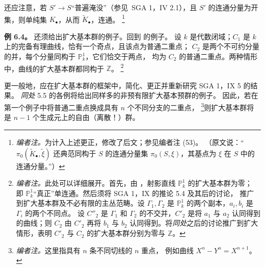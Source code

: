 还应注意，若 \(S'\to S\)“普遍淹没”（参见\ SGA 1，IV 2.1），且 \(S'\)
的连通分量为开集，则单纯集 \(K_\bullet\)，从而 \(\widetilde K_\bullet\)，连通。
\footnote{\textit{编者注。}为计入上述更正，修改了后文；参见编者注 (53)。
（原文说：“\(\pi_0(\widetilde K_\bullet,\widetilde\xi)\) 还典范同构于
\(S\) 的连通分量集 \(\pi_0(S,\xi)\)，其基点为 \(\xi\) 在 \(S\) 中的连通分量。”）}

\par\medskip\noindent
\textbf{例 6.4。}\enspace
还须给出扩大基本群的例子。回到  的例子。
设 \(k\) 是代数闭域；\(C_1\) 是 \(k\) 上的完备有理曲线，恰有一个奇点，且该点为普通二重点；
\(C_2\) 是两个不可约分量的并，每个分量同构于 \(\mathbb P^1_k\)，它们恰交于两点，
均为 \(C_2\) 的普通二重点。两种情形中，曲线的扩大基本群都同构于 \(\mathbb Z\)。
\footnote{\textit{编者注。}此处可以详细展开。首先，由
，射影直线 \(\mathbb P^1_k\) 的扩大基本群为零；
即 \(\mathbb P^1_k\)“真正”单连通。然后须将 SGA 1，IX 的推论 5.4 及其后的讨论，
推广到扩大基本群及不必有限的主丛范畴。设 \(\Gamma_1,\Gamma_2\) 是
\(\mathbb P^1_k\) 的两个副本，\(a_i,b_i\) 是 \(\Gamma_i\) 的两个不同点。
设 \(C''_2\) 是 \(\Gamma_1\) 和 \(\Gamma_2\) 的不交并，\(C'_2\) 是将
\(a_1\) 与 \(a_2\) 认同得到的曲线；则 \(C_2\) 由 \(C'_2\) 再将
\(b_1\) 与 \(b_2\) 认同得到。将\emph{同处}之后的讨论推广到扩大情形，表明
\(C'_2\) 与 \(C_2\) 的扩大基本群分别为零与 \(\mathbb Z\)。}

更一般地，应在扩大基本群的框架中，简化、更正并重新研究 SGA 1，IX 5 的结果。
\emph{同处} 5.5 的各例将给出同样多的非预有限扩大基本预群的例子。
因此，若在第一个例子中将普通二重点换成具有 \(n\) 个不同分支的二重点，
\footnote{\textit{编者注。}这里指具有 \(n\) 条不同切线的 \(n\) 重点，
例如曲线 \(X^n-Y^n=X^{n+1}\)。}则扩大基本群将是 \(n-1\) 个生成元上的自由（离散！）群。